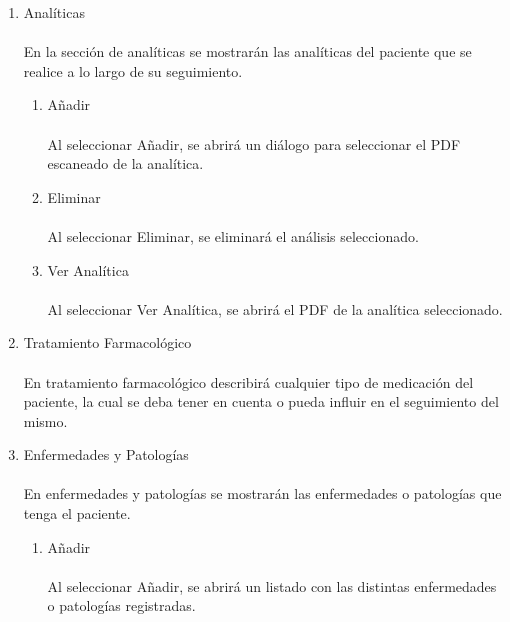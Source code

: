 \begin{enumerate}
\begin{enumerate}
\item Analíticas\\\\
En la sección de analíticas se mostrarán las analíticas del paciente que se realice a lo largo de su seguimiento.
\begin{enumerate}
\item Añadir\\\\
Al seleccionar Añadir, se abrirá un diálogo para seleccionar el PDF escaneado de la analítica.\\
\item Eliminar\\\\
Al seleccionar Eliminar, se eliminará el análisis seleccionado.\\
\item Ver Analítica\\\\
Al seleccionar Ver Analítica, se abrirá el PDF de la analítica seleccionado.\\
\end{enumerate}
\item Tratamiento Farmacológico\\\\
En tratamiento farmacológico describirá cualquier tipo de medicación del paciente, la cual se deba tener en cuenta o pueda influir en el seguimiento del mismo.\\
\item Enfermedades y Patologías\\\\
En enfermedades y patologías se mostrarán las enfermedades o patologías que tenga el paciente.\\
\begin{enumerate}
\item Añadir\\\\
Al seleccionar Añadir, se abrirá un listado con las distintas enfermedades o patologías registradas.\\\\
\begin{figure}[H]
  \label{enfermedad}
  \begin{center}

\end{center}
\end{figure}
\end{enumerate}
\end{enumerate}
\end{enumerate}
